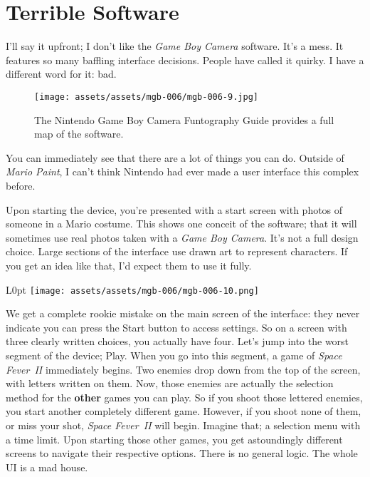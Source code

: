 \documentclass{book}
\begin{document}
\FloatBarrier\needspace{10mm}\section*{Terrible Software}\nopagebreak[4]

I’ll say it upfront; I don’t like the \emph{Game Boy Camera} software. It’s a mess. It features so many baffling interface decisions. People have called it quirky. I have a different word for it: bad.

\begin{figure}[hbt]
\vskip 10pt
\centering \texttt{[image: assets/assets/mgb-006/mgb-006-9.jpg]}\par\pagetwodescription The Nintendo Game Boy Camera Funtography Guide provides a full map of the software.
\vskip 6pt
\end{figure}

You can immediately see that there are a lot of things you can do. Outside of \emph{Mario Paint}, I can’t think Nintendo had ever made a user interface this complex before.

Upon starting the device, you’re presented with a start screen with photos of someone in a Mario costume. This shows one conceit of the software; that it will sometimes use real photos taken with a \emph{Game Boy Camera}. It’s not a full design choice. Large sections of the interface use drawn art to represent characters. If you get an idea like that, I’d expect them to use it fully.

\begin{wrapfigure}{L}{0pt} \texttt{[image: assets/assets/mgb-006/mgb-006-10.png]}\end{wrapfigure}

We get a complete rookie mistake on the main screen of the interface: they never indicate you can press the Start button to access settings. So on a screen with three clearly written choices, you actually have four. Let’s jump into the worst segment of the device; Play. When you go into this segment, a game of \emph{Space Fever~II} immediately begins. Two enemies drop down from the top of the screen, with letters written on them. Now, those enemies are actually the selection method for the \textbf{other} games you can play. So if you shoot those lettered enemies, you start another completely different game. However, if you shoot none of them, or miss your shot, \emph{Space Fever~II} will begin. Imagine that; a selection menu with a time limit. Upon starting those other games, you get astoundingly different screens to navigate their respective options. There is no general logic. The whole UI is a mad house.
\end{document}
